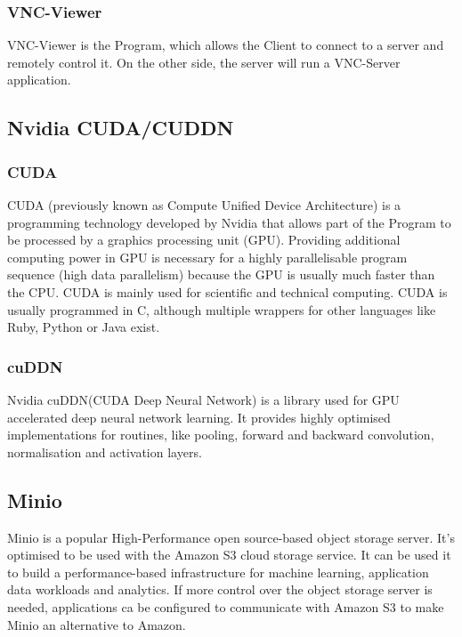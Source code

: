 \subsubsection{VNC-Viewer}
VNC-Viewer is the Program, which allows the Client to connect to a server and remotely control it. On the other side, the server will run a VNC-Server application.


\subsection{Nvidia CUDA/CUDDN}

\subsubsection{CUDA}
CUDA (previously known as Compute Unified Device Architecture) is a programming technology developed by Nvidia that allows part of the Program to be processed by a graphics processing unit (GPU). Providing additional computing power in GPU is necessary for a highly parallelisable program sequence (high data parallelism) because the GPU is usually much faster than the CPU. CUDA is mainly used for scientific and technical computing. CUDA is usually programmed in C, although multiple wrappers for other languages like Ruby, Python or Java exist.

\subsubsection{cuDDN}
Nvidia cuDDN(CUDA Deep Neural Network) is a library used for GPU accelerated deep neural network learning. It provides highly optimised implementations for routines, like pooling, forward and backward convolution, normalisation and activation layers.

\subsection{Minio}
Minio is a popular High-Performance open source-based object storage server. It's optimised to be used with the Amazon S3 cloud storage service. It can be used it to build a performance-based infrastructure for machine learning, application data workloads and analytics. If more control over the object storage server is needed, applications ca be configured to communicate with Amazon S3 to make Minio an alternative to Amazon.

